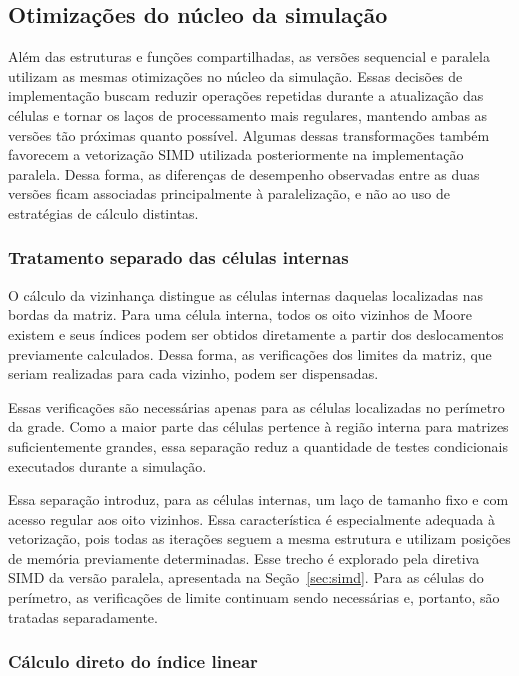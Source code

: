 \documentclass[11pt,a4paper]{article}
\begin{document}
\subsection{Otimizações do núcleo da simulação}
\label{sec:otimizacoes}

Além das estruturas e funções compartilhadas, as versões sequencial e paralela utilizam as mesmas otimizações no núcleo da simulação. Essas decisões de implementação buscam reduzir operações repetidas durante a atualização das células e tornar os laços de processamento mais regulares, mantendo ambas as versões tão próximas quanto possível. Algumas dessas transformações também favorecem a vetorização SIMD utilizada posteriormente na implementação paralela. Dessa forma, as diferenças de desempenho observadas entre as duas versões ficam associadas principalmente à paralelização, e não ao uso de estratégias de cálculo distintas.

\subsubsection{Tratamento separado das células internas}

O cálculo da vizinhança distingue as células internas daquelas localizadas nas bordas da matriz. Para uma célula interna, todos os oito vizinhos de Moore existem e seus índices podem ser obtidos diretamente a partir dos deslocamentos previamente calculados. Dessa forma, as verificações dos limites da matriz, que seriam realizadas para cada vizinho, podem ser dispensadas.

Essas verificações são necessárias apenas para as células localizadas no perímetro da grade. Como a maior parte das células pertence à região interna para matrizes suficientemente grandes, essa separação reduz a quantidade de testes condicionais executados durante a simulação.

Essa separação introduz, para as células internas, um laço de tamanho fixo e com acesso regular aos oito vizinhos. Essa característica é especialmente adequada à vetorização, pois todas as iterações seguem a mesma estrutura e utilizam posições de memória previamente determinadas. Esse trecho é explorado pela diretiva SIMD da versão paralela, apresentada na Seção~\ref{sec:simd}. Para as células do perímetro, as verificações de limite continuam sendo necessárias e, portanto, são tratadas separadamente.

\subsubsection{Cálculo direto do índice linear}
\end{document}
